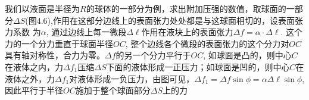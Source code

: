 我们以液面是半径为$R$的球体的一部分为例，求出附加压强的数值，取球面的一部分$\Delta S$(图4.6),作用在这部分边线上的表面张力处处都是与这球面相切的，设表面张力系数
为$\alpha$, 通过边线上每一微段$\Delta\ell$作用在液块上的表面张力$\Delta f=\alpha\cdot \Delta\ell$. 这个力的一个分力垂直于球面半径$OC$, 整个边线各个微段的表面张力的这个分力对$OC$具有轴对称性，合力为零。$\Delta f$的另一个分力平行于$OC$, 如球面是凸的，则中心$C$在液体之内，力$\Delta f_1$压缩$\Delta S$下面的液体形成一正压力；如球面是凹的，则中心$C$在液体之外，力$\Delta f_1$对液体形成一负压力，由图可见，$\Delta f_1=\Delta f\sin\phi=\alpha\Delta \ell\sin\phi$, 因此平行于半径$OC$施加于整个球面部分$\Delta S$上的力












